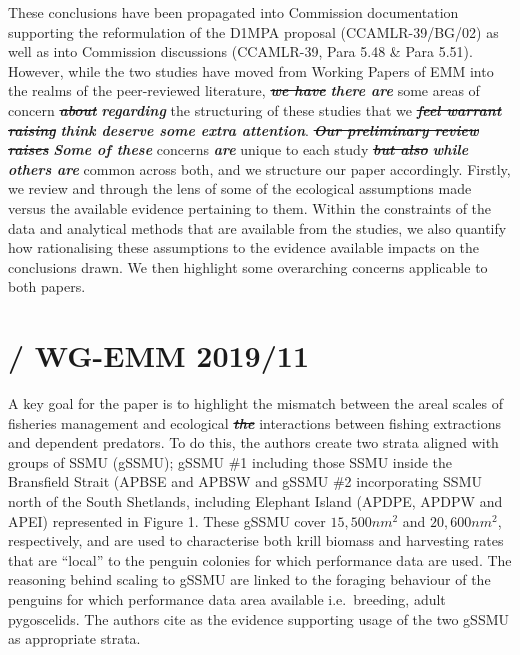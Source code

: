 \documentclass[]{elsarticle} %
\begin{document}
These conclusions have been propagated into Commission documentation
supporting the reformulation of the D1MPA proposal (CCAMLR-39/BG/02) as
well as into Commission discussions (CCAMLR-39, Para 5.48 \& Para 5.51).
However, while the two studies have moved from Working Papers of EMM
into the realms of the peer-reviewed literature, \textbf{\emph{\st{we
have}}} \textbf{\emph{there are}} some areas of concern
\textbf{\emph{\st{about}}} \textbf{\emph{regarding}} the structuring of
these studies that we \textbf{\emph{\st{feel warrant raising}}}
\textbf{\emph{think deserve some extra attention}}.
\textbf{\emph{\st{Our preliminary review raises}}} \textbf{\emph{Some of
these}} concerns \textbf{\emph{are}} unique to each study
\textbf{\emph{\st{but also}}} \textbf{\emph{while others are}} common
across both, and we structure our paper accordingly. Firstly, we review
\citet{Watters2020} and \citet{Kruger2021} through the lens of some of
the ecological assumptions made versus the available evidence pertaining
to them. Within the constraints of the data and analytical methods that
are available from the studies, we also quantify how rationalising these
assumptions to the evidence available impacts on the conclusions drawn.
We then highlight some overarching concerns applicable to both papers.

\section{\texorpdfstring{\citet{Watters2020} / WG-EMM
2019/11}{@Watters2020 / WG-EMM 2019/11}}\label{watters2020-wg-emm-201911}

A key goal for the paper is to highlight the mismatch between the areal
scales of fisheries management and ecological \textbf{\emph{\st{the}}}
interactions between fishing extractions and dependent predators. To do
this, the authors create two strata aligned with groups of SSMU (gSSMU);
gSSMU \#1 including those SSMU inside the Bransfield Strait (APBSE and
APBSW and gSSMU \#2 incorporating SSMU north of the South Shetlands,
including Elephant Island (APDPE, APDPW and APEI) represented in Figure
1. These gSSMU cover \(15,500nm^2\) and \(20,600nm^2\), respectively,
and are used to characterise both krill biomass and harvesting rates
that are ``local'' to the penguin colonies for which performance data
are used. The reasoning behind scaling to gSSMU are linked to the
foraging behaviour of the penguins for which performance data area
available i.e.~breeding, adult pygoscelids. The authors cite
\citet{Hinke2017} as the evidence supporting usage of the two gSSMU as
appropriate strata.
\end{document}
